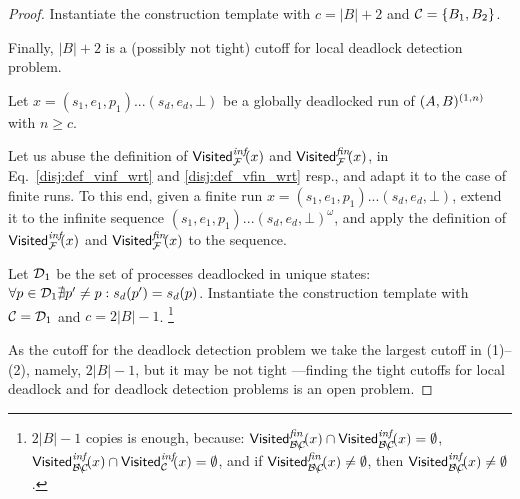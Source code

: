 \begin{proof}
Instantiate the construction template with $c=|B|+2$ and $\mathcal{C} = \{B_1,B_2\}$.

\smallskip
Finally, $|B|+2$ is a (possibly not tight) cutoff for local deadlock detection problem.


Let $x=(s_1,e_1,p_1)...(s_d,e_d,\bot)$ be a globally deadlocked run of $(A,B)^{(1,n)}$ 
with $n\geq c$.

Let us abuse the definition of $\mathsf{Visited}^{\textit{inf}}_{\mathcal{F}}\!(x)$ and $\mathsf{Visited}^{\textit{fin}}_{\mathcal{F}}\!(x)$,
in Eq.~\ref{disj:def_vinf_wrt} and \ref{disj:def_vfin_wrt} resp., 
and adapt it to the case of finite runs.
To this end, given a finite run $x=(s_1,e_1,p_1)...(s_d,e_d,\bot)$, 
extend it to the infinite sequence $(s_1,e_1,p_1)...(s_d,e_d,\bot)^\omega$, 
and apply the definition of $\mathsf{Visited}^{\textit{inf}}_{\mathcal{F}}\!(x)$ and $\mathsf{Visited}^{\textit{fin}}_{\mathcal{F}}\!(x)$ to the sequence.

Let $\mathcal{D}_1$ be the set of processes deadlocked in unique states:
$\forall p\in \mathcal{D}_1 \nexists p' \neq p: s_d(p')=s_d(p)$.
Instantiate the construction template with $\mathcal{C} = \mathcal{D}_1$ and $c=2|B|-1$.
\footnote{$2|B|-1$ copies is enough, because: 
          $\mathsf{Visited}^{\textit{fin}}_{\mathcal{B}\!\setminus\!\mathcal{C}}\!(x) \cap \mathsf{Visited}^{\textit{inf}}_{\mathcal{B}\!\setminus\!\mathcal{C}}\!(x) = \emptyset$,
          $\mathsf{Visited}^{\textit{inf}}_{\mathcal{B}\!\setminus\!\mathcal{C}}\!(x) \cap \mathsf{Visited}^{\textit{inf}}_{\mathcal{C}}\!(x) = \emptyset$,
          and if $\mathsf{Visited}^{\textit{fin}}_{\mathcal{B}\!\setminus\!\mathcal{C}}\!(x) \neq \emptyset$, 
          then $\mathsf{Visited}^{\textit{inf}}_{\mathcal{B}\!\setminus\!\mathcal{C}}\!(x) \neq \emptyset$.}


As the cutoff for the deadlock detection problem we take the largest cutoff in (1)--(2), namely, $2|B|-1$,
but it may be not tight%
---finding the tight cutoffs for local deadlock and for deadlock detection problems is an open problem.


\end{proof}
